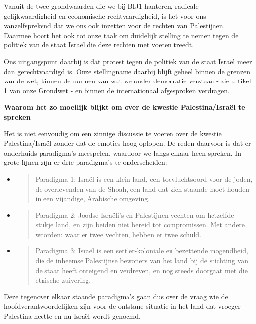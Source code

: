 Vanuit de twee grondwaarden die we bij BIJ1 hanteren, radicale
gelijkwaardigheid en economische rechtvaardigheid, is het voor ons
vanzelfsprekend dat we ons ook inzetten voor de rechten van Palestijnen.
Daarmee hoort het ook tot onze taak om duidelijk stelling te nemen tegen
de politiek van de staat Israël die deze rechten met voeten treedt.

Ons uitgangspunt daarbij is dat protest tegen de politiek van de staat
Israël meer dan gerechtvaardigd is. Onze stellingname daarbij blijft
geheel binnen de grenzen van de wet, binnen de normen van wat we onder
democratie verstaan - zie artikel 1 van onze Grondwet - en binnen de
internationaal afgesproken verdragen.

\textbf{Waarom het zo moeilijk blijkt om over de kwestie
Palestina/Israël te spreken}

Het is niet eenvoudig om een zinnige discussie te voeren over de kwestie
Palestina/Israël zonder dat de emoties hoog oplopen. De reden daarvoor
is dat er onderhuids paradigma's meespelen, waardoor we langs elkaar
heen spreken. In grote lijnen zijn er drie paradigma's te onderscheiden:

\begin{itemize}
\item
  \begin{quote}
  Paradigma 1: Israël is een klein land, een toevluchtsoord voor de
  joden, de overlevenden van de Shoah, een land dat zich staande moet
  houden in een vijandige, Arabische omgeving.
  \end{quote}
\item
  \begin{quote}
  Paradigma 2: Joodse Israëli's en Palestijnen vechten om hetzelfde
  stukje land, en zijn beiden niet bereid tot compromissen. Met andere
  woorden: waar er twee vechten, hebben er twee schuld.
  \end{quote}
\item
  \begin{quote}
  Paradigma 3: Israël is een settler-koloniale en bezettende mogendheid,
  die de inheemse Palestijnse bewoners van het land bij de stichting van
  de staat heeft onteigend en verdreven, en nog steeds doorgaat met die
  etnische zuivering.
  \end{quote}
\end{itemize}

Deze tegenover elkaar staande paradigma's gaan dus over de vraag wie de
hoofdverantwoordelijken zijn voor de ontstane situatie in het land dat
vroeger Palestina heette en nu Israël wordt genoemd.


